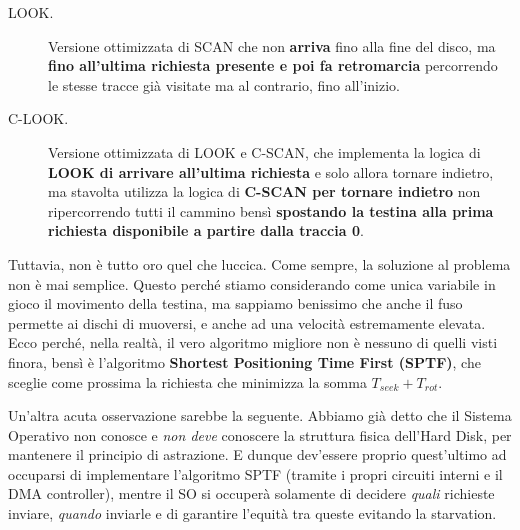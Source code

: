 \documentclass[12pt]{report}
\begin{document}
\begin{description}
		\item[LOOK.] Versione ottimizzata di SCAN che non \textbf{arriva} fino alla fine del disco, ma \textbf{fino all'ultima richiesta presente e poi fa retromarcia} percorrendo le stesse tracce già visitate ma al contrario, fino all'inizio.
		
		\item[C-LOOK.] Versione ottimizzata di LOOK e C-SCAN, che implementa la logica di \textbf{LOOK di arrivare all'ultima richiesta} e solo allora tornare indietro, ma stavolta utilizza la logica di \textbf{C-SCAN per tornare indietro} non ripercorrendo tutti il cammino bensì \textbf{spostando la testina alla prima richiesta disponibile a partire dalla traccia 0}.
	\end{description}
	
	Tuttavia, non è tutto oro quel che luccica. Come sempre, la soluzione al problema non è mai semplice. Questo perché stiamo considerando come unica variabile in gioco il movimento della testina, ma sappiamo benissimo che anche il fuso permette ai dischi di muoversi, e anche ad una velocità estremamente elevata.\\
	Ecco perché, nella realtà, il vero algoritmo migliore non è nessuno di quelli visti finora, bensì è l'algoritmo \textbf{Shortest Positioning Time First (SPTF)}, che sceglie come prossima la richiesta che minimizza la somma $T_{seek} + T_{rot}$.
	\smallbreak
	
	Un'altra acuta osservazione sarebbe la seguente. Abbiamo già detto che il Sistema Operativo non conosce e \textit{non deve} conoscere la struttura fisica dell'Hard Disk, per mantenere il principio di astrazione. E dunque dev'essere proprio quest'ultimo ad occuparsi di implementare l'algoritmo SPTF (tramite i propri circuiti interni e il DMA controller), mentre il SO si occuperà solamente di decidere \textit{quali} richieste inviare, \textit{quando} inviarle e di garantire l'equità tra queste evitando la starvation.
	
\end{document}
